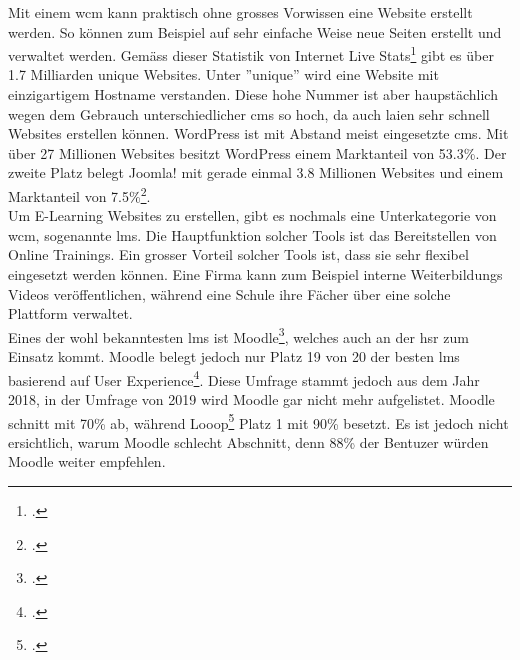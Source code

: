 Mit einem \gls{wcm} kann praktisch ohne grosses Vorwissen eine Website erstellt werden. So können zum Beispiel auf sehr einfache Weise neue Seiten erstellt und verwaltet werden. Gemäss dieser Statistik von Internet Live Stats\footcite{internet_live_stats} gibt es über 1.7 Milliarden unique Websites. Unter ''unique'' wird eine Website mit einzigartigem Hostname verstanden. Diese hohe Nummer ist aber haupstächlich wegen dem Gebrauch unterschiedlicher \gls{cms} so hoch, da auch laien sehr schnell Websites erstellen können. WordPress ist mit Abstand meist eingesetzte \gls{cms}. Mit über 27 Millionen Websites besitzt WordPress einem Marktanteil von 53.3\%. Der zweite Platz belegt Joomla! mit gerade einmal 3.8 Millionen Websites und einem Marktanteil von 7.5\%\footcite{cms_market_share}.\\

Um E-Learning Websites zu erstellen, gibt es nochmals eine Unterkategorie von \gls{wcm}, sogenannte \gls{lms}. Die Hauptfunktion solcher Tools ist das Bereitstellen von Online Trainings. Ein grosser Vorteil solcher Tools ist, dass sie sehr flexibel eingesetzt werden können. Eine Firma kann zum Beispiel interne Weiterbildungs Videos veröffentlichen, während eine Schule ihre Fächer über eine solche Plattform verwaltet. \\

Eines der wohl bekanntesten \gls{lms} ist Moodle\footcite{moodle_homepage}, welches auch an der \gls{hsr} zum Einsatz kommt. Moodle belegt jedoch nur Platz 19 von 20 der besten \gls{lms} basierend auf User Experience\footcite{moodle_ux}. Diese Umfrage stammt jedoch aus dem Jahr 2018, in der Umfrage von 2019 wird Moodle gar nicht mehr aufgelistet. Moodle schnitt mit 70\% ab, während Looop\footcite{looop_homepage} Platz 1 mit 90\% besetzt. Es ist jedoch nicht ersichtlich, warum Moodle schlecht Abschnitt, denn 88\% der Bentuzer würden Moodle weiter empfehlen.


%
%
%

